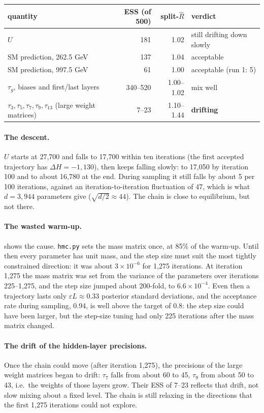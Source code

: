 \documentclass[11pt]{article}
\newcommand{\file}[1]{\nolinkurl{#1}}
\begin{document}
\begin{center}
\small
\begin{tabular}{lrrl}
\toprule
quantity & ESS (of 500) & split-$\hat R$ & verdict\\
\midrule
$U$ & 181 & 1.02 & still drifting down slowly\\
SM prediction, 262.5 GeV & 137 & 1.04 & acceptable\\
SM prediction, 997.5 GeV & 61 & 1.00 & acceptable (run 1: 5)\\
$\tau_g$, biases and first/last layers & 340--520 & 1.00--1.02 & mix well\\
$\tau_3, \tau_5, \tau_7, \tau_9, \tau_{13}$ (large weight matrices) & 7--23 & 1.10--1.44 & \textbf{drifting}\\
\bottomrule
\end{tabular}
\end{center}

\paragraph{The descent.} $U$ starts at 27,700 and falls to 17,700 within ten iterations
(the first accepted trajectory has $\Delta H = -1{,}130$), then keeps falling slowly: to
17,050 by iteration 100 and to about 16,780 at the end. During sampling it still falls by
about 5 per 100 iterations, against an iteration-to-iteration fluctuation of 47, which is
what $d = 3{,}944$ parameters give ($\sqrt{d/2} \approx 44$). The chain is close to
equilibrium, but not there.

\paragraph{The wasted warm-up.}  shows the cause. \file{hmc.py} sets the
mass matrix once, at 85\% of the warm-up. Until then every parameter has unit mass, and the
step size must suit the most tightly constrained direction: it was about
$3 \times 10^{-6}$ for 1,275 iterations. At iteration 1,275 the mass matrix was set from
the variance of the parameters over iterations 225--1,275, and the step size jumped about
200-fold, to $6.6 \times 10^{-4}$. Even then a trajectory lasts only
$\varepsilon L \approx 0.33$ posterior standard deviations, and the acceptance rate during
sampling, 0.94, is well above the target of 0.8: the step size could have been larger,
but the step-size tuning had only 225 iterations after the mass matrix changed.

\paragraph{The drift of the hidden-layer precisions.} Once the chain could move
(after iteration 1,275), the precisions of the large weight matrices began to drift:
$\tau_7$ falls from about 60 to 45, $\tau_9$ from about 50 to 43, i.e.\ the weights of
those layers grow. Their ESS of 7--23 reflects that drift, not slow mixing about a fixed
level. The chain is still relaxing in the directions that the first 1,275 iterations
could not explore.
\end{document}
